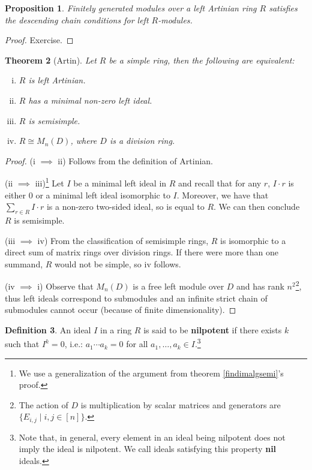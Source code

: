 \documentclass{tufte-handout} %
\newtheorem{thm}{Theorem}
\newtheorem{prop}[thm]{Proposition}
\theoremstyle{definition}
\newtheorem{defn}[thm]{Definition}
\theoremstyle{remark}
\begin{document}
\begin{prop}
	Finitely generated modules over a left Artinian ring $R$ satisfies the descending chain conditions for left $R$-modules.
\end{prop}
\begin{proof}
	Exercise. %
\end{proof}
\begin{thm}[Artin]
	Let $R$ be a simple ring, then the following are equivalent:
	\begin{enumerate}[i.]
		\item $R$ is left Artinian.
		\item $R$ has a minimal non-zero left ideal.
		\item $R$ is semisimple.
		\item $R \cong M_n(D)$, where $D$ is a division ring.
	\end{enumerate}
\end{thm}
\begin{proof}
	(i $\implies$ ii) Follows from the definition of Artinian.
	
	(ii $\implies$ iii)\footnote{We use a generalization of the argument from theorem \ref{findimalgsemi}'s proof.} Let $I$ be a minimal left ideal in $R$ and recall that for any $r$, $I\cdot r$ is either $0$ or a minimal left ideal isomorphic to $I$. Moreover, we have that $\sum_{r \in R} I\cdot r$ is a non-zero two-sided ideal, so is equal to $R$. We can then conclude $R$ is semisimple.
	
	(iii $\implies$ iv) From the classification of semisimple rings, $R$ is isomorphic to a direct sum of matrix rings over division rings. If there were more than one summand, $R$ would not be simple, so iv follows.
	
	(iv $\implies$ i) Observe that $M_n(D)$ is a free left module over $D$ and has rank $n^2$\footnote{The action of $D$ is multiplication by scalar matrices and generators are $\{E_{i,j} \mid i, j \in [n]\}$.}, thus left ideals correspond to submodules and an infinite strict chain of submodules cannot occur (because of finite dimensionality).
\end{proof}
\begin{defn}
	An ideal $I$ in a ring $R$ is said to be \textbf{nilpotent} if there exists $k$ such that $I^k = 0$, i.e.: $a_1\cdots a_k = 0$ for all $a_1, \dots, a_k \in I$.\footnote{Note that, in general, every element in an ideal being nilpotent does not imply the ideal is nilpotent. We call ideals satisfying this property \textbf{nil} ideals.}
\end{defn}
\end{document}
